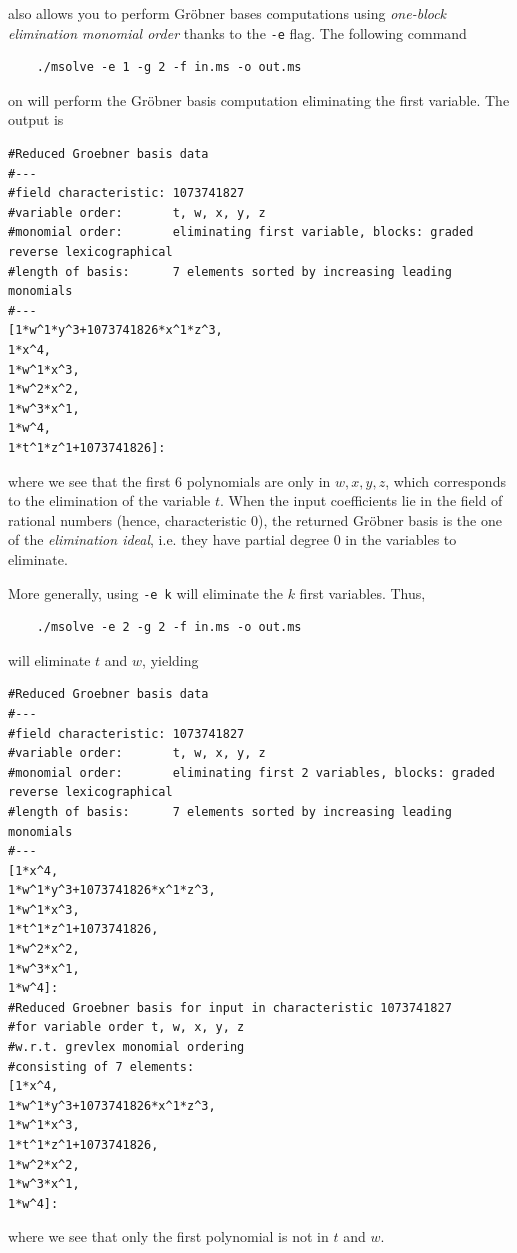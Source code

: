 \documentclass[a4paper,english,11pt]{scrartcl}
\theoremstyle{definition}
\theoremstyle{remark}
\begin{document}
\msolve also allows you to perform Gr\"obner bases computations using
\emph{one-block elimination monomial order}
thanks to the \verb+-e+ flag. The following command
\begin{tcolorbox} %
  \begin{verbatim}
    ./msolve -e 1 -g 2 -f in.ms -o out.ms
  \end{verbatim}
\end{tcolorbox}
on
will perform the Gr\"obner basis computation eliminating the first
variable.
The output is
\begin{tcolorbox}
  \begin{lstlisting}
#Reduced Groebner basis data
#---
#field characteristic: 1073741827
#variable order:       t, w, x, y, z
#monomial order:       eliminating first variable, blocks: graded reverse lexicographical
#length of basis:      7 elements sorted by increasing leading monomials
#---
[1*w^1*y^3+1073741826*x^1*z^3,
1*x^4,
1*w^1*x^3,
1*w^2*x^2,
1*w^3*x^1,
1*w^4,
1*t^1*z^1+1073741826]:
  \end{lstlisting}
\end{tcolorbox}
where we see that the first $6$ polynomials are only in $w,x,y,z$,
which corresponds to the elimination of the variable $t$. When the input
coefficients lie in the field of rational numbers (hence, characteristic $0$),
the returned Gr\"obner basis is the one of the {\em elimination ideal}, i.e. they
have partial degree $0$ in the variables to eliminate.

More generally, using \verb+-e k+ will eliminate the $k$ first
variables. Thus,
\begin{tcolorbox} %
  \begin{verbatim}
    ./msolve -e 2 -g 2 -f in.ms -o out.ms
  \end{verbatim}
\end{tcolorbox}
will eliminate $t$ and $w$, yielding
\begin{tcolorbox} %
  \begin{lstlisting}
#Reduced Groebner basis data
#---
#field characteristic: 1073741827
#variable order:       t, w, x, y, z
#monomial order:       eliminating first 2 variables, blocks: graded reverse lexicographical
#length of basis:      7 elements sorted by increasing leading monomials
#---
[1*x^4,
1*w^1*y^3+1073741826*x^1*z^3,
1*w^1*x^3,
1*t^1*z^1+1073741826,
1*w^2*x^2,
1*w^3*x^1,
1*w^4]:
#Reduced Groebner basis for input in characteristic 1073741827
#for variable order t, w, x, y, z
#w.r.t. grevlex monomial ordering
#consisting of 7 elements:
[1*x^4,
1*w^1*y^3+1073741826*x^1*z^3,
1*w^1*x^3,
1*t^1*z^1+1073741826,
1*w^2*x^2,
1*w^3*x^1,
1*w^4]:
  \end{lstlisting}
\end{tcolorbox}
where we see that only the first polynomial is not in $t$ and $w$.
\end{document}

